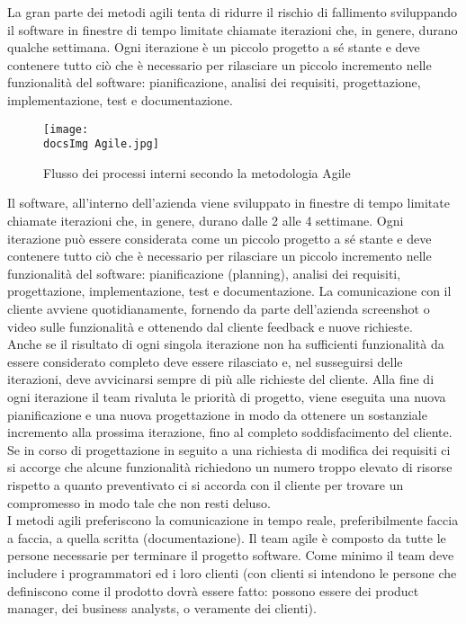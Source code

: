 La gran parte dei metodi agili tenta di ridurre il rischio di fallimento sviluppando il software in finestre di tempo limitate chiamate iterazioni che, in genere, durano qualche settimana. Ogni iterazione è un piccolo progetto a sé stante e deve contenere tutto ciò che è necessario per rilasciare un piccolo incremento nelle funzionalità del software: pianificazione, analisi dei requisiti, progettazione, implementazione, test e documentazione.
\\

\begin{figure}[H]
	\centering
	\texttt{[image: \\docsImg Agile.jpg]}
	\caption{Flusso dei processi interni secondo la metodologia Agile}
	\label{fig:Flusso dei processi interni}
\end{figure}

Il software, all'interno dell'azienda viene sviluppato in finestre di tempo limitate chiamate iterazioni che, in genere, durano dalle 2 alle 4 settimane. Ogni iterazione pu\`o essere considerata come un piccolo progetto a sé stante e deve contenere tutto ciò che è necessario per rilasciare un piccolo incremento nelle funzionalità del software: pianificazione (planning), analisi dei requisiti, progettazione, implementazione, test e documentazione. La comunicazione con il cliente avviene quotidianamente, fornendo da parte dell'azienda screenshot o video sulle funzionalit\`a e ottenendo dal cliente feedback e nuove richieste.
\\
Anche se il risultato di ogni singola iterazione non ha sufficienti funzionalità da essere considerato completo deve essere rilasciato e, nel susseguirsi delle iterazioni, deve avvicinarsi sempre di più alle richieste del cliente. Alla fine di ogni iterazione il team rivaluta le priorit\`a di progetto, viene eseguita una nuova pianificazione e una nuova progettazione in modo da ottenere un sostanziale incremento alla prossima iterazione, fino al completo soddisfacimento del cliente. Se in corso di progettazione in seguito a una richiesta di modifica dei requisiti ci si accorge che alcune funzionalit\`a richiedono un numero troppo elevato di risorse rispetto a quanto preventivato ci si accorda con il cliente per trovare un compromesso in modo tale che non resti deluso.
\\
I metodi agili preferiscono la comunicazione in tempo reale, preferibilmente faccia a faccia, a quella scritta (documentazione). Il team agile è composto da tutte le persone necessarie per terminare il progetto software. Come minimo il team deve includere i programmatori ed i loro clienti (con clienti si intendono le persone che definiscono come il prodotto dovrà essere fatto: possono essere dei product manager, dei business analysts, o veramente dei clienti).

